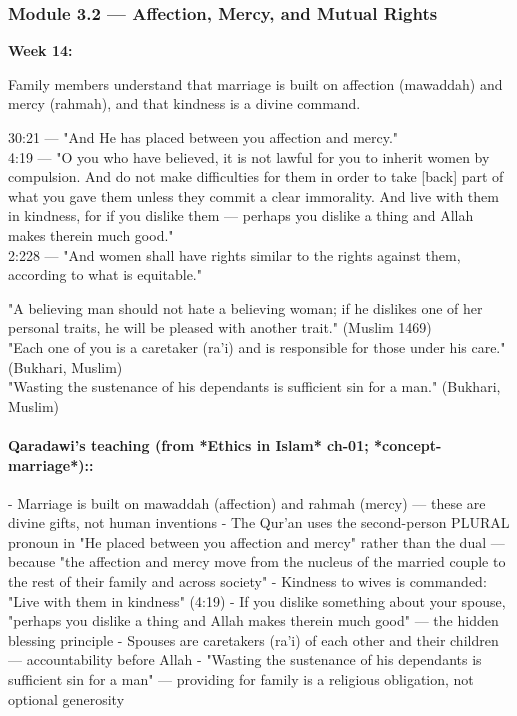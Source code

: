 \documentclass[11pt,a4paper]{article}
\begin{document}
\subsubsection*{Module 3.2 --- Affection, Mercy, and Mutual Rights}
\textbf{Week 14:} 

\begin{outcomebox} Family members understand that marriage is built on affection (mawaddah) and mercy (rahmah), and that kindness is a divine command. \end{outcomebox}

\begin{quranbox} 30:21 --- "And He has placed between you affection and mercy." \\ 4:19 --- "O you who have believed, it is not lawful for you to inherit women by compulsion. And do not make difficulties for them in order to take [back] part of what you gave them unless they commit a clear immorality. And live with them in kindness, for if you dislike them --- perhaps you dislike a thing and Allah makes therein much good." \\ 2:228 --- "And women shall have rights similar to the rights against them, according to what is equitable." \end{quranbox}

\begin{hadithbox} "A believing man should not hate a believing woman; if he dislikes one of her personal traits, he will be pleased with another trait." (Muslim 1469) \\ "Each one of you is a caretaker (ra'i) and is responsible for those under his care." (Bukhari, Muslim) \\ "Wasting the sustenance of his dependants is sufficient sin for a man." (Bukhari, Muslim) \end{hadithbox}

\paragraph*{Qaradawi's teaching (from *Ethics in Islam* ch-01; *concept-marriage*)::}  - Marriage is built on mawaddah (affection) and rahmah (mercy) --- these are divine gifts, not human inventions - The Qur'an uses the second-person PLURAL pronoun in "He placed between you affection and mercy" rather than the dual --- because "the affection and mercy move from the nucleus of the married couple to the rest of their family and across society" - Kindness to wives is commanded: "Live with them in kindness" (4:19) - If you dislike something about your spouse, "perhaps you dislike a thing and Allah makes therein much good" --- the hidden blessing principle - Spouses are caretakers (ra'i) of each other and their children --- accountability before Allah - "Wasting the sustenance of his dependants is sufficient sin for a man" --- providing for family is a religious obligation, not optional generosity
\end{document}
